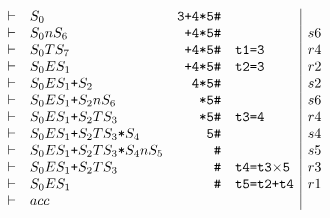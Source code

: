 \documentclass[dvipdfmx]{jarticle}
\begin{document}
\[\begin{array}{clrl|l}
  \vdash & S_0 & \texttt{3+4*5\#} & & \\
  \vdash & S_0nS_6 & \texttt{+4*5\#} & & s6 \\
  \vdash & S_0TS_7 & \texttt{+4*5\#} & \texttt{t1=3} & r4\\
  \vdash & S_0ES_1 & \texttt{+4*5\#} & \texttt{t2=3} & r2\\
  \vdash & S_0ES_1\texttt{+} S_2 & \texttt{4*5\#} & & s2\\
  \vdash & S_0ES_1\texttt{+} S_2nS_6 & \texttt{*5\#} & & s6\\
  \vdash & S_0ES_1\texttt{+} S_2TS_3 & \texttt{*5\#} & \texttt{t3=4} & r4\\
  \vdash & S_0ES_1\texttt{+} S_2TS_3\texttt{*} S_4 & \texttt{5\#} & & s4\\
  \vdash & S_0ES_1\texttt{+} S_2TS_3\texttt{*} S_4nS_5 & \texttt{\#} & & s5\\
  \vdash & S_0ES_1\texttt{+} S_2TS_3 & \texttt{\#} & \texttt{t4=t3$\times$5} & r3\\
  \vdash & S_0ES_1 & \texttt{\#} & \texttt{t5=t2+t4} & r1\\
  \vdash & acc & & 
\end{array}\]
\end{document}
